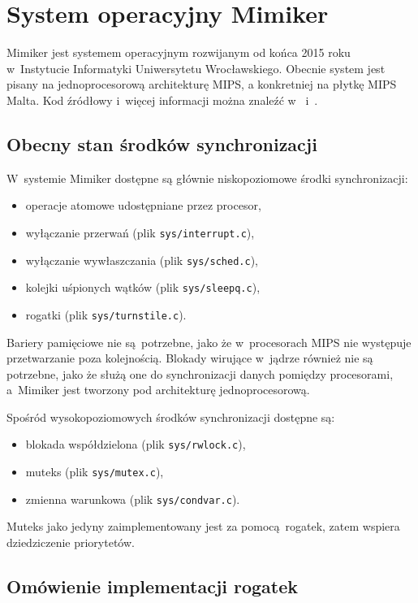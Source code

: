 \documentclass[shortabstract]{iithesis}
\theoremstyle{definition} \newtheorem*{definition}{Definicja}
\theoremstyle{definition} \newtheorem*{example}{Przykład}
\theoremstyle{definition} \newtheorem*{remark}{Uwaga}
\begin{document}
\chapter{System operacyjny Mimiker}
\label{chap:mimiker}

Mimiker jest systemem operacyjnym rozwijanym od końca 2015 roku w~Instytucie Informatyki
Uniwersytetu Wrocławskiego. Obecnie system jest pisany na jednoprocesorową architekturę MIPS,
a konkretniej na płytkę MIPS Malta. Kod źródłowy i~więcej informacji można znaleźć
w~\cite{mimiker:github} i~\cite{mimiker:opengrok}.

\section{Obecny stan środków synchronizacji}

W~systemie Mimiker dostępne są głównie niskopoziomowe środki synchronizacji:
\begin{itemize}
\item operacje atomowe udostępniane przez procesor,
\item wyłączanie przerwań (plik \texttt{sys/interrupt.c}),
\item wyłączanie wywłaszczania (plik \texttt{sys/sched.c}),
\item kolejki uśpionych wątków (plik \texttt{sys/sleepq.c}),
\item rogatki (plik \texttt{sys/turnstile.c}).
\end{itemize}

Bariery pamięciowe nie są potrzebne, jako że w~procesorach MIPS nie występuje przetwarzanie
poza kolejnością. Blokady wirujące w~jądrze również nie są potrzebne, jako że służą one do synchronizacji
danych pomiędzy procesorami, a~Mimiker jest tworzony pod architekturę jednoprocesorową.

Spośród wysokopoziomowych środków synchronizacji dostępne są:
\begin{itemize}
\item blokada współdzielona (plik \texttt{sys/rwlock.c}),
\item muteks (plik \texttt{sys/mutex.c}),
\item zmienna warunkowa (plik \texttt{sys/condvar.c}).
\end{itemize}

Muteks jako jedyny zaimplementowany jest za pomocą rogatek, zatem wspiera dziedziczenie priorytetów.

\section{Omówienie implementacji rogatek}
\label{sec:turnstiles}
\end{document}
